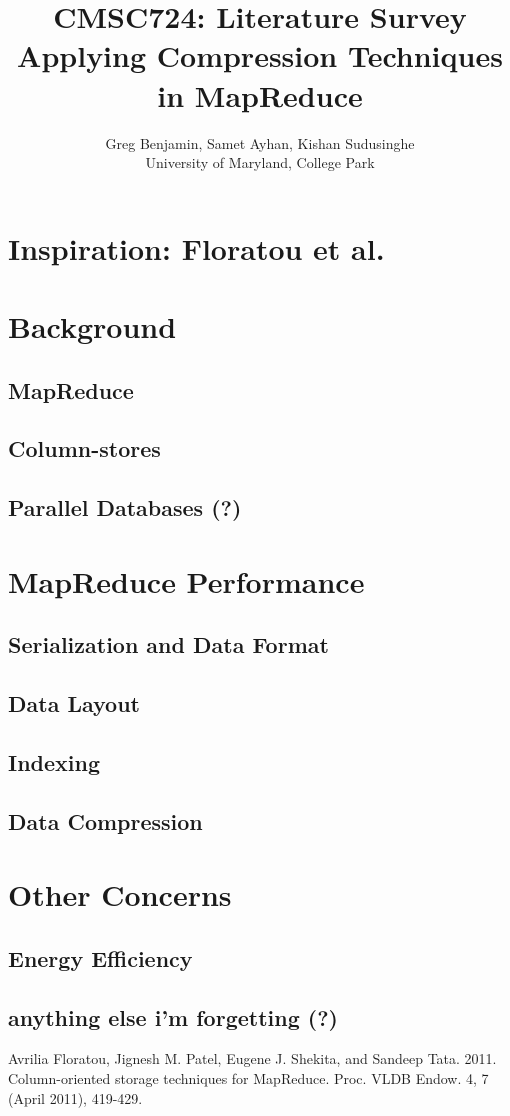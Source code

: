 \documentclass{article}
\title{CMSC724: Literature Survey \\
Applying Compression Techniques in MapReduce}
\author{Greg Benjamin, Samet Ayhan, Kishan Sudusinghe \\
University of Maryland, College Park}
\begin{document}
\maketitle

\section{Inspiration: Floratou et al.}

\section{Background}
\subsection{MapReduce}
\subsection{Column-stores}
\subsection{Parallel Databases (?)}

\section{MapReduce Performance}
\subsection{Serialization and Data Format}
\subsection{Data Layout}
\subsection{Indexing}
\subsection{Data Compression}

\section{Other Concerns}
\subsection{Energy Efficiency}
\subsection{anything else i'm forgetting (?)}

\begin{thebibliography}{10}

 Avrilia Floratou, Jignesh M. Patel, Eugene J. Shekita, and Sandeep
	Tata. 2011. Column-oriented storage techniques for MapReduce.
	Proc. VLDB Endow. 4, 7 (April 2011), 419-429.

\end{thebibliography}
\end{document}
